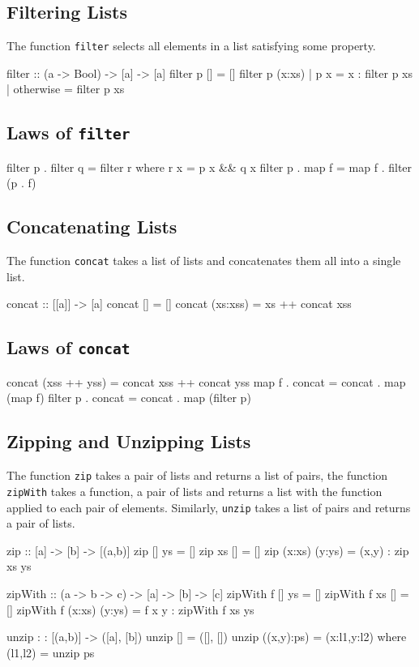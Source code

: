 \documentclass[10pt]{article}
\begin{document}
\subsection{Filtering Lists}
The function \texttt{filter} selects all elements in a list satisfying some property.
\begin{code}
filter :: (a -> Bool) -> [a] -> [a]
filter p [] = []
filter p (x:xs)
  | p x = x : filter p xs
  | otherwise = filter p xs
\end{code}
\subsection{Laws of \texttt{filter}}
\begin{code}
filter p . filter q = filter r
                        where r x = p x && q x
filter p . map f = map f . filter (p . f)
\end{code}
\subsection{Concatenating Lists}
The function \texttt{concat} takes a list of lists and concatenates them all into a single list.
\begin{code}
concat :: [[a]] -> [a]
concat [] = []
concat (xs:xss) = xs ++ concat xss
\end{code}
\subsection{Laws of \texttt{concat}}
\begin{code}
concat (xss ++ yss) = concat xss ++ concat yss
map f . concat = concat . map (map f)
filter p . concat = concat . map (filter p)
\end{code}
\subsection{Zipping and Unzipping Lists}
The function \texttt{zip} takes a pair of lists and returns a list of pairs, the function \texttt{zipWith} takes a function, a pair of lists and returns a list with the function applied to each pair of elements.
Similarly, \texttt{unzip} takes a list of pairs and returns a pair of lists.
\begin{code}
zip :: [a] -> [b] -> [(a,b)]
zip [] ys = []
zip xs [] = []
zip (x:xs) (y:ys) = (x,y) : zip xs ys

zipWith :: (a -> b -> c) -> [a] -> [b] -> [c]
zipWith f [] ys = [] 
zipWith f xs [] = []
zipWith f (x:xs) (y:ys) = f x y : zipWith f xs ys

unzip : : [(a,b)] -> ([a], [b])
unzip [] = ([], [])
unzip ((x,y):ps) = (x:l1,y:l2)
  where (l1,l2) = unzip ps
\end{code}
\end{document}
